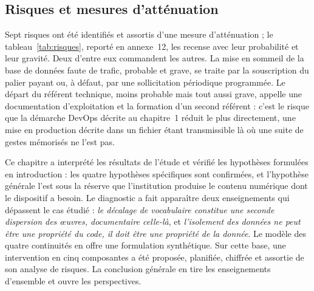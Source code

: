 \subsection{Risques et mesures d'atténuation}

Sept risques ont été identifiés et assortis d'une mesure d'atténuation ; le
tableau~\ref{tab:risques}, reporté en annexe~12, les recense avec leur
probabilité et leur gravité. Deux d'entre eux commandent les autres. La mise en
sommeil de la base de données faute de trafic, probable et grave, se traite par
la souscription du palier payant ou, à défaut, par une sollicitation périodique
programmée. Le départ du référent technique, moins probable mais tout aussi
grave, appelle une documentation d'exploitation et la formation d'un second
référent : c'est le risque que la démarche DevOps décrite au chapitre~1 réduit
le plus directement, une mise en production décrite dans un fichier étant
transmissible là où une suite de gestes mémorisés ne l'est pas.

\conclchap

Ce chapitre a interprété les résultats de l'étude et vérifié les hypothèses
formulées en introduction : les quatre hypothèses spécifiques sont confirmées,
et l'hypothèse générale l'est sous la réserve que l'institution produise le
contenu numérique dont le dispositif a besoin. Le diagnostic a fait apparaître
deux enseignements qui dépassent le cas étudié : \emph{le décalage de
vocabulaire constitue une seconde dispersion des œuvres, documentaire celle-là},
et \emph{l'isolement des données ne peut être une propriété du code, il doit
être une propriété de la donnée}. Le modèle des quatre continuités en offre une
formulation synthétique. Sur cette base, une intervention en cinq composantes a
été proposée, planifiée, chiffrée et assortie de son analyse de risques. La
conclusion générale en tire les enseignements d'ensemble et ouvre les
perspectives.
